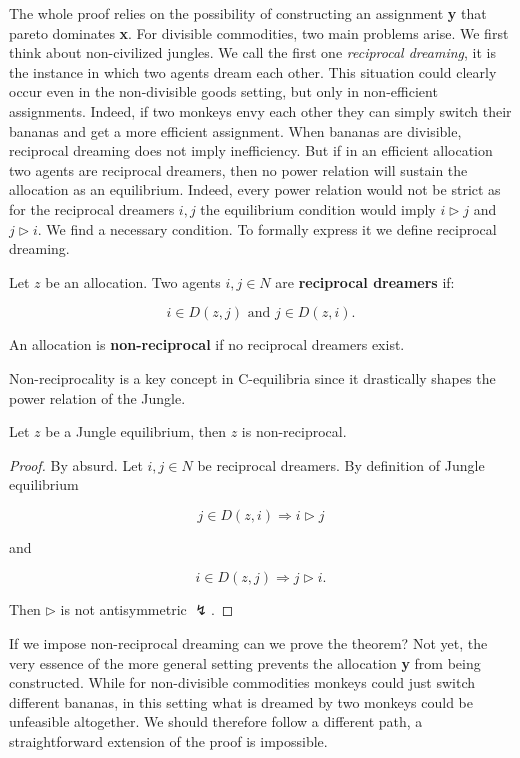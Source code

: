 The whole proof relies on the possibility of constructing an assignment \textbf{y} that pareto dominates \textbf{x}. For divisible commodities, two main problems arise. We first think about non-civilized jungles. We call the first one \textit{reciprocal dreaming}, it is the instance in which two agents dream each other. This situation could clearly occur even in the non-divisible goods setting, but only in non-efficient assignments. Indeed, if two monkeys envy each other they can simply switch their bananas and get a more efficient assignment. When bananas are divisible, reciprocal dreaming does not imply inefficiency. But if in an efficient allocation two agents are reciprocal dreamers, then no power relation will sustain the allocation as an equilibrium. Indeed, every power relation would not be strict as for the reciprocal dreamers $i,j$ the equilibrium condition would imply $i\triangleright j$ and $j\triangleright i$. We find a necessary condition. To formally express it we define reciprocal dreaming.

\begin{definition}\label{Def: reciprocal dreaming}
    Let $z$ be an allocation. Two agents $i,j\in N$ are \textbf{reciprocal dreamers} if:

    \[i \in D(z,j) \text{ and } j \in D(z,i).\]

    An allocation is \textbf{non-reciprocal} if no reciprocal dreamers exist. 
\end{definition}

Non-reciprocality is a key concept in C-equilibria since it drastically shapes the power relation of the Jungle. 


\begin{proposition}\label{Jungle implies no reciprocality}
    Let $z$ be a Jungle equilibrium, then $z$ is non-reciprocal.

    \begin{proof}
        By absurd. Let $i,j\in N$ be reciprocal dreamers. By definition of Jungle equilibrium

        \[j\in D(z,i)\Rightarrow i\triangleright j\]

        and 

        \[i \in D(z,j) \Rightarrow j\triangleright i.\]

        Then $\triangleright$ is not antisymmetric $\lightning$. 
    \end{proof}
\end{proposition}

If we impose non-reciprocal dreaming can we prove the theorem? Not yet, the very essence of the more general setting prevents the allocation \textbf{y} from being constructed. While for non-divisible commodities monkeys could just switch different bananas, in this setting what is dreamed by two monkeys could be unfeasible altogether. We should therefore follow a different path, a straightforward extension of the proof is impossible.

